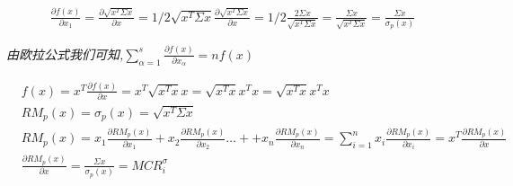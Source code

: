 \documentclass{scrartcl}
\numberwithin{equation}{section}
\begin{document}
\begin{equation}
    \begin{aligned}
        \frac{\partial f(x)}{\partial x_1} = \frac{\partial \sqrt{x^T \Sigma  x}}{\partial x}
        = 1/2 \sqrt{x^T \Sigma x} \frac{\partial \sqrt{x^T \Sigma  x}}{\partial x}
        = 1/2 \frac{2 \Sigma x } {\sqrt{x^T \Sigma x} } = \frac{ \Sigma x} {\sqrt{x^T \Sigma  x}} = \frac{ \Sigma x}{\sigma_p(x)}
    \end{aligned}
\end{equation}

\textsl{由欧拉公式我们可知,$\sum_{\alpha=1}^s{\frac{\partial f(x)}{\partial x_{\alpha}}} = n f(x)$}

\begin{equation}
    \begin{aligned}
         & f(x) = x^T \frac{\partial f(x)}{\partial x} = x^T \sqrt{x^T x} x = \sqrt{x^T x}x^T x =\sqrt{x^T x}x^T x                                                                                                                                                  \\
         & RM_p(x) = \sigma_p(x) = \sqrt{x^T \Sigma x}                                                                                                                                                                                                              \\
         & RM_p(x) = x_1 \frac{\partial RM_p(x)}{\partial x_1} + x_2 \frac{\partial RM_p(x)}{\partial x_2} \dots + + x_n \frac{\partial RM_p(x)}{\partial x_n} = \sum_{i=1}^n {x_i \frac{\partial RM_p(x)}{\partial x_i}} = x^T \frac{\partial RM_p(x)}{\partial x} \\
         & \frac{\partial RM_p(x)}{\partial x} =   \frac{ \Sigma x}{\sigma_p(x)} = MCR_i^{\sigma}
    \end{aligned}
\end{equation}
\end{document}

